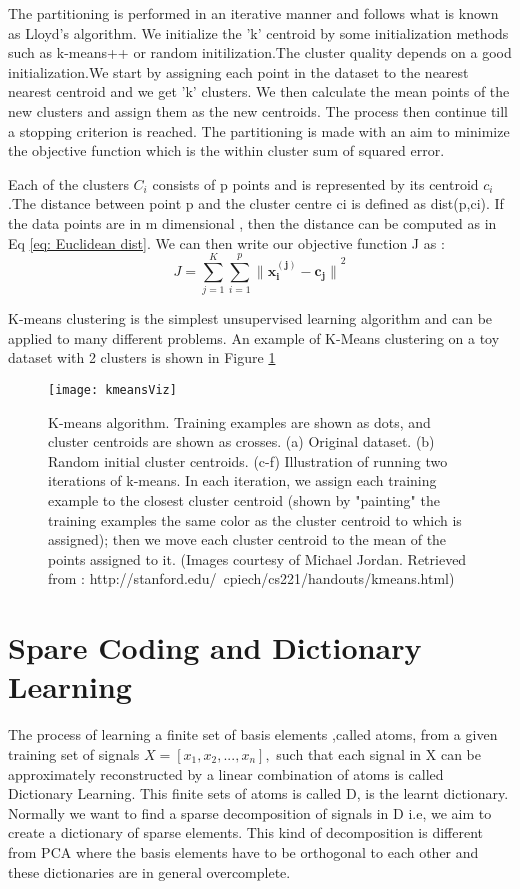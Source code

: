 The partitioning is performed in an iterative manner and follows what is known as Lloyd's algorithm\cite{lloydsalgo}. We initialize the 'k' centroid by some initialization methods such as k-means++ or random initilization.The cluster quality depends on a good initialization.We start by assigning each point in the dataset to the nearest nearest centroid and we get 'k' clusters. We then calculate the mean points of the new clusters and assign them as the new centroids. The process then continue till a stopping criterion is reached. The partitioning is made with an aim to minimize the objective function which is the within cluster sum of squared error.

Each of the clusters $C_i$ consists of p points and is represented by its centroid $c_i$.The distance between point p and the cluster centre ci is defined as dist(p,ci). If the data points are in m dimensional , then the distance can be computed as in Eq \ref{eq: Euclidean dist}. We can then write our objective function J as :
\begin{equation}
J = \sum\limits_{j=1}^{K} \sum\limits_{i=1}^{p} {\lVert\mathbf{x^{(j)}_i - c_j}  \rVert}^2
\end{equation}

K-means clustering is the simplest unsupervised learning algorithm and can be applied to many different problems. An example of K-Means clustering on a toy dataset with 2 clusters is shown in Figure \ref{fig:kmeansvisz}
\begin{figure}
	\centering
	\texttt{[image: kmeansViz]}
	\caption[K-Means Visualization]{ K-means algorithm. Training examples are shown as dots, and cluster centroids are shown as crosses. (a) Original dataset. (b) Random initial cluster centroids. (c-f) Illustration of running two iterations of k-means. In each iteration, we assign each training example to the closest cluster centroid (shown by "painting" the training examples the same color as the cluster centroid to which is assigned); then we move each cluster centroid to the mean of the points assigned to it. (Images courtesy of Michael Jordan. Retrieved from : http://stanford.edu/~cpiech/cs221/handouts/kmeans.html)}
	\label{fig:kmeansvisz}
\end{figure}

\section{Spare Coding and Dictionary Learning}\label{sec:dlsparse}
The process of learning a finite set of basis elements ,called atoms, from a given training set of signals $X=[x_1,x_2,...,x_n], $ such that each signal in X can be approximately reconstructed by a linear combination of atoms is called Dictionary Learning. This finite sets of atoms is called D, is the learnt dictionary. Normally we want to find a sparse decomposition of signals in D i.e, we aim to create a dictionary of sparse elements. This kind of decomposition is different from PCA where the basis elements have to be orthogonal to each other and these dictionaries are in general overcomplete.\\

